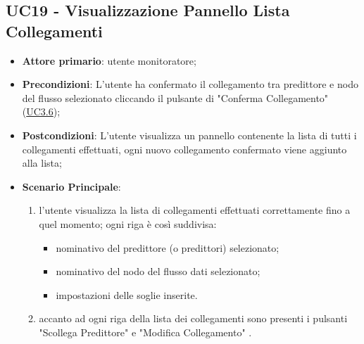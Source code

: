 	

	\label{par:UC19}
	\subsection{UC19 - Visualizzazione Pannello Lista Collegamenti}
		\begin{itemize}
			\item\textbf{Attore primario}: utente monitoratore;
			\item\textbf{Precondizioni}: L’utente ha confermato il collegamento tra predittore e nodo del flusso selezionato cliccando il pulsante di "Conferma Collegamento" (\hyperref[par:UC3.6]{UC3.6});
			\item\textbf{Postcondizioni}: L’utente visualizza un pannello contenente la lista di tutti i collegamenti effettuati, ogni nuovo collegamento confermato viene aggiunto alla lista; 
			\item\textbf{Scenario Principale}: 
				\begin{enumerate} 
					\item l'utente visualizza la lista di collegamenti effettuati correttamente fino a quel momento; ogni riga è così suddivisa:
					\begin{itemize}
						\item nominativo del predittore (o predittori) selezionato;
						\item nominativo del nodo del flusso dati selezionato;
						\item impostazioni delle soglie inserite.
					\end{itemize}
					\item accanto ad ogni riga della lista dei collegamenti sono presenti i pulsanti "Scollega Predittore" e "Modifica Collegamento" .	
				\end{enumerate}		
		\end{itemize}


	\label{par:UC20}
